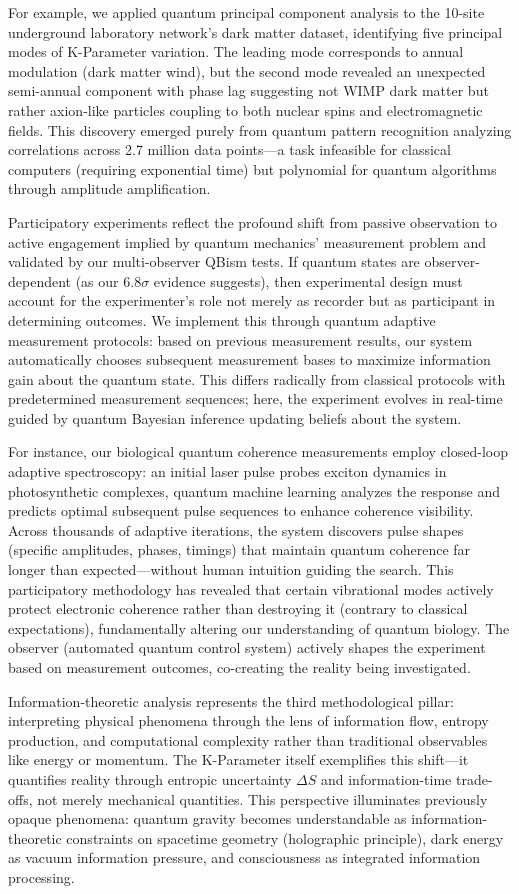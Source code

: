 \documentclass[11pt,a4paper,twoside]{article}
\begin{document}
For example, we applied quantum principal component analysis to the 10-site underground laboratory network's dark matter dataset, identifying five principal modes of K-Parameter variation. The leading mode corresponds to annual modulation (dark matter wind), but the second mode revealed an unexpected semi-annual component with phase lag suggesting not WIMP dark matter but rather axion-like particles coupling to both nuclear spins and electromagnetic fields. This discovery emerged purely from quantum pattern recognition analyzing correlations across 2.7 million data points—a task infeasible for classical computers (requiring exponential time) but polynomial for quantum algorithms through amplitude amplification.

Participatory experiments reflect the profound shift from passive observation to active engagement implied by quantum mechanics' measurement problem and validated by our multi-observer QBism tests. If quantum states are observer-dependent (as our 6.8$\sigma$ evidence suggests), then experimental design must account for the experimenter's role not merely as recorder but as participant in determining outcomes. We implement this through quantum adaptive measurement protocols: based on previous measurement results, our system automatically chooses subsequent measurement bases to maximize information gain about the quantum state. This differs radically from classical protocols with predetermined measurement sequences; here, the experiment evolves in real-time guided by quantum Bayesian inference updating beliefs about the system.

For instance, our biological quantum coherence measurements employ closed-loop adaptive spectroscopy: an initial laser pulse probes exciton dynamics in photosynthetic complexes, quantum machine learning analyzes the response and predicts optimal subsequent pulse sequences to enhance coherence visibility. Across thousands of adaptive iterations, the system discovers pulse shapes (specific amplitudes, phases, timings) that maintain quantum coherence far longer than expected—without human intuition guiding the search. This participatory methodology has revealed that certain vibrational modes actively protect electronic coherence rather than destroying it (contrary to classical expectations), fundamentally altering our understanding of quantum biology. The observer (automated quantum control system) actively shapes the experiment based on measurement outcomes, co-creating the reality being investigated.

Information-theoretic analysis represents the third methodological pillar: interpreting physical phenomena through the lens of information flow, entropy production, and computational complexity rather than traditional observables like energy or momentum. The K-Parameter itself exemplifies this shift—it quantifies reality through entropic uncertainty $\Delta S$ and information-time trade-offs, not merely mechanical quantities. This perspective illuminates previously opaque phenomena: quantum gravity becomes understandable as information-theoretic constraints on spacetime geometry (holographic principle), dark energy as vacuum information pressure, and consciousness as integrated information processing.
\end{document}

